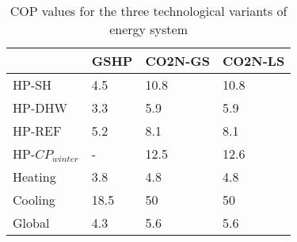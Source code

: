 \begin{table}[htp]
\centering
\caption{COP values for the three technological variants of energy system}\vspace{2mm}
\label{tab:V_cops} 
\begin{tabular}{llll}
	\toprule
	& GSHP & CO2N-GS & CO2N-LS \\ \midrule
	HP-SH            & 4.5  & 10.8    & 10.8    \\
	HP-DHW           & 3.3  & 5.9     & 5.9     \\
	HP-REF           & 5.2  & 8.1     & 8.1     \\
	HP-$CP_{winter}$ & -    & 12.5    & 12.6    \\
	Heating          & 3.8  & 4.8     & 4.8     \\
	Cooling          & 18.5 & 50      & 50      \\
	Global           & 4.3  & 5.6     & 5.6    \\ \bottomrule
\end{tabular}
\end{table}
